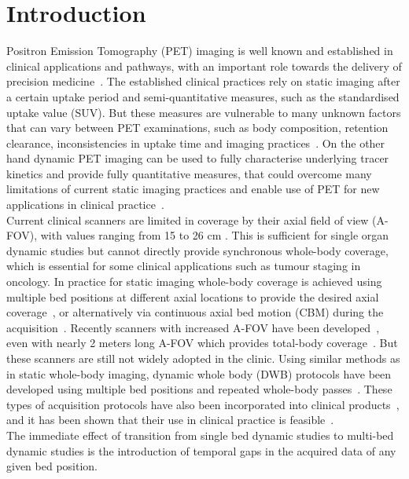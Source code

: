 \section{Introduction}
Positron Emission Tomography (PET) imaging is well known and established in clinical applications and pathways, with an important role towards the delivery of precision medicine~\cite{Subramaniam2017}. The established clinical practices rely on static imaging after a certain uptake period and semi-quantitative measures, such as the standardised uptake value (SUV). But these measures are vulnerable to many unknown factors that can vary between PET examinations, such as body composition, retention clearance, inconsistencies in uptake time and imaging practices~\cite{Boellaard2011}. On the other hand dynamic PET imaging can be used to fully characterise underlying tracer kinetics and provide fully quantitative measures, that could overcome many limitations of current static imaging practices and enable use of PET for new applications in clinical practice~\cite{Lammertsma2017,Dimitrakopoulou2021,Meikle2021}. \\
Current clinical scanners are limited in coverage by their axial field of view (A-FOV), with values ranging from 15 to 26 cm \cite{Vandenberghe2020}. This is sufficient for single organ dynamic studies but cannot directly provide synchronous whole-body coverage, which is essential for some clinical applications such as tumour staging in oncology. 
In practice for static imaging whole-body coverage is achieved using multiple bed positions at different axial locations to provide the desired axial coverage~\cite{Schubert1996}, or alternatively via continuous axial bed motion (CBM) during the acquisition~\cite{Panin2014}. 
Recently scanners with increased A-FOV have been developed~\cite{Karp2020,Siegel2020},
even with nearly 2 meters long A-FOV which provides total-body coverage~\cite{Cherry2018}. 
But these scanners are still not widely adopted in the clinic. 
Using similar methods as in static whole-body imaging, dynamic whole body (DWB) protocols have been developed using multiple bed positions and repeated whole-body passes~\cite {Karakatsanis2011,Karakatsanis2013,Rahmim2019}. These types of acquisition protocols have also been incorporated into clinical products~\cite{Hu2020}, and it has been shown that their use in clinical practice is feasible~\cite{Fahrni2019,Dias2020}. \\
The immediate effect of transition from single bed dynamic studies to multi-bed dynamic studies is the introduction of temporal gaps in the acquired data of any given bed position. 
